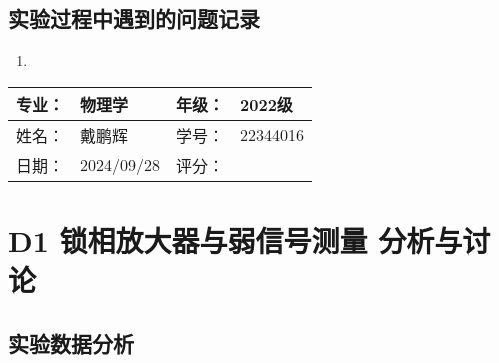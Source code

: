 \documentclass[dvipsnames, svgnames,a4paper,11pt]{article}
\begin{document}









\clearpage
\subsection{实验过程中遇到的问题记录}

\begin{enumerate}
	\item 
	
\end{enumerate}
	

\clearpage
\begin{table}
	\renewcommand\arraystretch{1.7}
	\begin{tabularx}{\textwidth}{|X|X|X|X|}
	\hline
	专业：& 物理学 &年级：& 2022级\\
	\hline
	姓名： & 戴鹏辉 & 学号：& 22344016\\
	\hline
    日期：& 2024/09/28 & 评分： &\\
	\hline
	\end{tabularx}
\end{table}

\section{D1 \quad 锁相放大器与弱信号测量 \quad\heiti 分析与讨论}

\subsection{实验数据分析}
\end{document}
